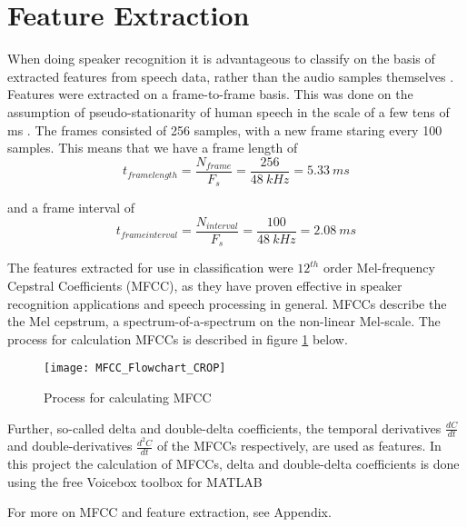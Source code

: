 \section*{Feature Extraction}
When doing speaker recognition it is advantageous to classify on the basis of extracted features from speech data, rather than the audio samples themselves \cite{Springer:36}.
Features were extracted on a frame-to-frame basis.
This was done on the assumption of pseudo-stationarity of human speech in the scale of a few tens of ms \cite{Springer:36}.
The frames consisted of 256 samples, with a new frame staring every 100 samples.
This means that we have a frame length of
\begin{equation}
t_{frame length} = \dfrac{N_{frame}}{F_s} = \dfrac{256}{48\ kHz} = 5.33\ ms
\end{equation}

and a frame interval of
\begin{equation}
t_{frame interval} = \dfrac{N_{interval}}{F_s} = \dfrac{100}{48\ kHz} = 2.08\ ms
\end{equation}

The features extracted for use in classification were $12^{th}$ order Mel-frequency Cepstral Coefficients (MFCC), as they have proven effective in speaker recognition applications and speech processing in general.
MFCCs describe the the Mel cepstrum, a spectrum-of-a-spectrum on the non-linear Mel-scale.
The process for calculation MFCCs is described in figure \ref{fig:MFCC_Flowchart} below.

\begin{figure}[H]
\centering
\texttt{[image: MFCC\_Flowchart\_CROP]}
\caption{Process for calculating MFCC}
\label{fig:MFCC_Flowchart}
\end{figure}

Further, so-called delta and double-delta coefficients, the temporal derivatives $ \frac{dC}{dt} $ and double-derivatives $\frac{d^2C}{dt}$ of the MFCCs respectively, are used as features.
In this project the calculation of MFCCs, delta and double-delta coefficients is done using the free Voicebox toolbox for MATLAB \cite{voicebox}

For more on MFCC and feature extraction, see Appendix.
